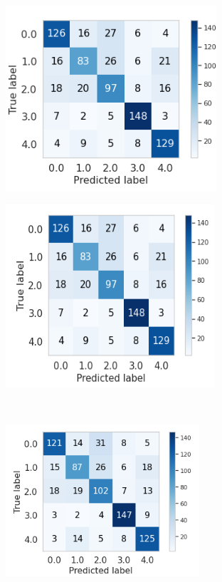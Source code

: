 \begin{figure}[H]
    \centering
     \begin{subfigure}{.55\textwidth}
        \centering
        \includegraphics[width=.55\linewidth]{figures/lgbm_test.png}
        \caption{}
        \label{fig:sub1}
    \end{subfigure}%
    \begin{subfigure}{.55\textwidth}
        \setcounter{subfigure}{1} %
        \centering
        \includegraphics[width=.55\linewidth]{figures/lgbm_hgb_test.png}
        \caption{}
        \label{fig:sub2}
    \end{subfigure}\\
    \bigskip
    \begin{subfigure}{.55\textwidth}
        \setcounter{subfigure}{2} %
        \centering
        \includegraphics[width=.55\linewidth]{figures/hgb_test.png}

\end{subfigure}
\end{figure}
